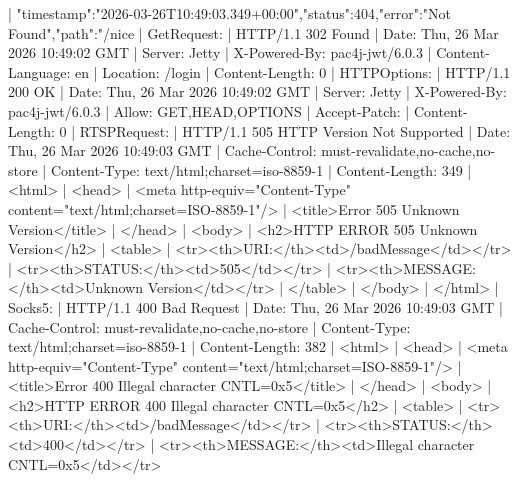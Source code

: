               |     {"timestamp":"2026-03-26T10:49:03.349+00:00","status":404,"error":"Not Found","path":"/nice%
              |   GetRequest: 
              |     HTTP/1.1 302 Found
              |     Date: Thu, 26 Mar 2026 10:49:02 GMT
              |     Server: Jetty
              |     X-Powered-By: pac4j-jwt/6.0.3
              |     Content-Language: en
              |     Location: /login
              |     Content-Length: 0
              |   HTTPOptions: 
              |     HTTP/1.1 200 OK
              |     Date: Thu, 26 Mar 2026 10:49:02 GMT
              |     Server: Jetty
              |     X-Powered-By: pac4j-jwt/6.0.3
              |     Allow: GET,HEAD,OPTIONS
              |     Accept-Patch: 
              |     Content-Length: 0
              |   RTSPRequest: 
              |     HTTP/1.1 505 HTTP Version Not Supported
              |     Date: Thu, 26 Mar 2026 10:49:03 GMT
              |     Cache-Control: must-revalidate,no-cache,no-store
              |     Content-Type: text/html;charset=iso-8859-1
              |     Content-Length: 349
              |     <html>
              |     <head>
              |     <meta http-equiv="Content-Type" content="text/html;charset=ISO-8859-1"/>
              |     <title>Error 505 Unknown Version</title>
              |     </head>
              |     <body>
              |     <h2>HTTP ERROR 505 Unknown Version</h2>
              |     <table>
              |     <tr><th>URI:</th><td>/badMessage</td></tr>
              |     <tr><th>STATUS:</th><td>505</td></tr>
              |     <tr><th>MESSAGE:</th><td>Unknown Version</td></tr>
              |     </table>
              |     </body>
              |     </html>
              |   Socks5: 
              |     HTTP/1.1 400 Bad Request
              |     Date: Thu, 26 Mar 2026 10:49:03 GMT
              |     Cache-Control: must-revalidate,no-cache,no-store
              |     Content-Type: text/html;charset=iso-8859-1
              |     Content-Length: 382
              |     <html>
              |     <head>
              |     <meta http-equiv="Content-Type" content="text/html;charset=ISO-8859-1"/>
              |     <title>Error 400 Illegal character CNTL=0x5</title>
              |     </head>
              |     <body>
              |     <h2>HTTP ERROR 400 Illegal character CNTL=0x5</h2>
              |     <table>
              |     <tr><th>URI:</th><td>/badMessage</td></tr>
              |     <tr><th>STATUS:</th><td>400</td></tr>
              |     <tr><th>MESSAGE:</th><td>Illegal character CNTL=0x5</td></tr>
}
